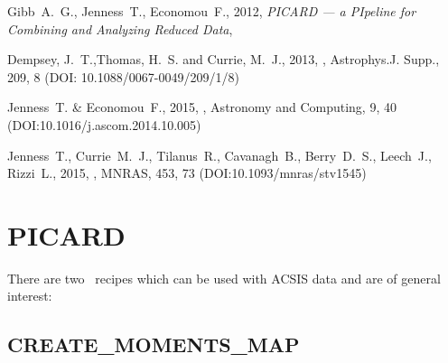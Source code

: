 \documentclass[11pt,oneside,chapters]{starlink}
\begin{document}
\begin{thebibliography}{}
Gibb~A.~G., Jenness~T., Economou~F., 2012, \textit{PICARD --- a
PIpeline for Combining and Analyzing Reduced Data},

Dempsey, J.~T.,Thomas, H.~S. and Currie, M.~J., 2013,
, Astrophys.J. Supp., 209, 8
(DOI: 10.1088/0067-0049/209/1/8)

Jenness~T. \& Economou~F., 2015,
, Astronomy and
Computing, 9, 40 (DOI:10.1016/j.ascom.2014.10.005)

Jenness~T., Currie~M.~J., Tilanus~R., Cavanagh~B., Berry~D.~S.,
Leech~J., Rizzi~L., 2015, ,
MNRAS, 453, 73 (DOI:10.1093/mnras/stv1545)

\end{thebibliography}

\newpage
\appendix

\chapter{PICARD}
\label{app:picard}
There are two \picard\ recipes which can be used with ACSIS data and are of general interest:

\section{CREATE\_MOMENTS\_MAP}
\end{document}
